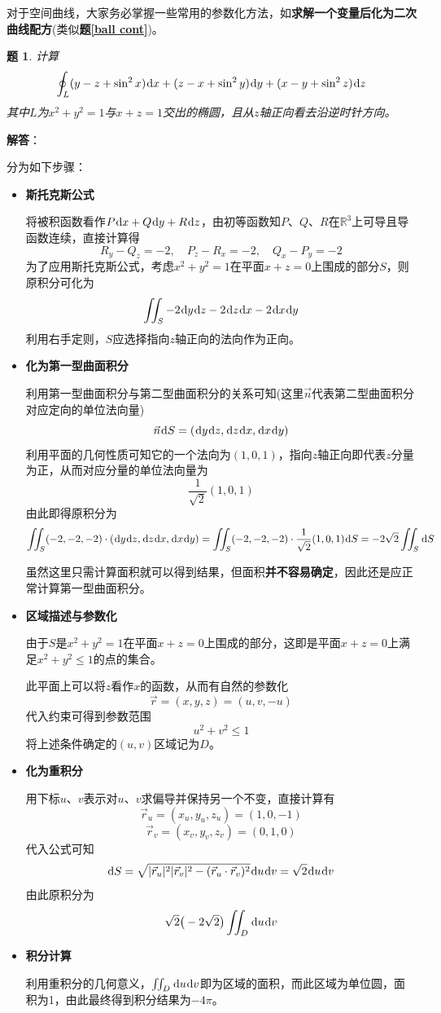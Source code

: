 \documentclass[a4paper,UTF8,fontset=windows,AutoFakeBold]{ctexart}
\newcommand*{\dr}{\hspace{0.07em}\mathrm{d}}
\newcommand*{\rb}{\mathbb{R}}
\newcommand*{\rv}{\vec{r}}
\newcommand*{\note}{\noindent *}
\theoremstyle{ex}
\newtheorem{exercise}{题}
\newcommand{\exref}[1]{\textbf{题\;\ref{#1}\;}}
\newcommand{\sol}[1]{{\vspace{5pt}\kaishu\noindent\textbf{解答}：\vspace{-3pt}
\begin{compactitem}
    \item[] #1
\end{compactitem}
}}
\begin{document}
\note 对于空间曲线，大家务必掌握一些常用的参数化方法，如\textbf{求解一个变量后化为二次曲线配方}(类似\exref{ball cont})。

\begin{framed}
\begin{exercise}\label{stolkes ellipse}
    计算
    $$\oint_L(y-z+\sin^2x)\dr x+(z-x+\sin^2y)\dr y+(x-y+\sin^2z)\dr z$$
    其中$L$为$x^2+y^2=1$与$x+z=1$交出的椭圆，且从$z$轴正向看去沿逆时针方向。
\end{exercise}
\sol{
    分为如下步骤：
    \begin{itemize}
        \item \textbf{斯托克斯公式}
        
        将被积函数看作$P\dr x+Q\dr y+R\dr z$，由初等函数知$P$、$Q$、$R$在$\rb^3$上可导且导函数连续，直接计算得
        $$R_y-Q_z=-2,\quad P_z-R_x=-2,\quad Q_x-P_y=-2$$
        为了应用斯托克斯公式，考虑$x^2+y^2=1$在平面$x+z=0$上围成的部分$S$，则原积分可化为
        $$\iint_S-2\dr y\dr z-2\dr z\dr x-2\dr x\dr y$$
        利用右手定则，$S$应选择指向$z$轴正向的法向作为正向。

        \item \textbf{化为第一型曲面积分}
        
        利用第一型曲面积分与第二型曲面积分的关系可知(这里$\vec{n}$代表第二型曲面积分对应定向的单位法向量)
        $$\vec{n}\dr S=(\dr y\dr z,\dr z\dr x,\dr x\dr y)$$
        利用平面的几何性质可知它的一个法向为$(1,0,1)$，指向$z$轴正向即代表$z$分量为正，从而对应分量的单位法向量为
        $$\frac{1}{\sqrt2}(1,0,1)$$
        由此即得原积分为
        $$\iint_S(-2,-2,-2)\cdot(\dr y\dr z,\dr z\dr x,\dr x\dr y)=\iint_S(-2,-2,-2)\cdot\frac{1}{\sqrt2}(1,0,1)\dr S=-2\sqrt2\iint_S\dr S$$

        \note 虽然这里只需计算面积就可以得到结果，但面积\textbf{并不容易确定}，因此还是应正常计算第一型曲面积分。

        \item \textbf{区域描述与参数化}
        
        由于$S$是$x^2+y^2=1$在平面$x+z=0$上围成的部分，这即是平面$x+z=0$上满足$x^2+y^2\le1$的点的集合。

        此平面上可以将$z$看作$x$的函数，从而有自然的参数化
        $$\vec{r}=(x,y,z)=(u,v,-u)$$
        代入约束可得到参数范围
        $$u^2+v^2\le1$$
        将上述条件确定的$(u,v)$区域记为$D$。

        \item \textbf{化为重积分}
        
        用下标$u$、$v$表示对$u$、$v$求偏导并保持另一个不变，直接计算有
        $$\rv_u=(x_u,y_u,z_u)=(1,0,-1)$$
        $$\rv_v=(x_v,y_v,z_v)=(0,1,0)$$
        代入公式可知
        $$\dr S=\sqrt{|\rv_u|^2|\rv_v|^2-(\rv_u\cdot\rv_v)^2}\dr u\dr v=\sqrt2\dr u\dr v$$
        由此原积分为
        $$\sqrt2\big(-2\sqrt2\big)\iint_D\dr u\dr v$$

        \item \textbf{积分计算}
        
        利用重积分的几何意义，$\iint_D\dr u\dr v$即为区域的面积，而此区域为单位圆，面积为1，由此最终得到积分结果为$-4\pi$。
    \end{itemize}
}
\end{framed}
\end{document}
